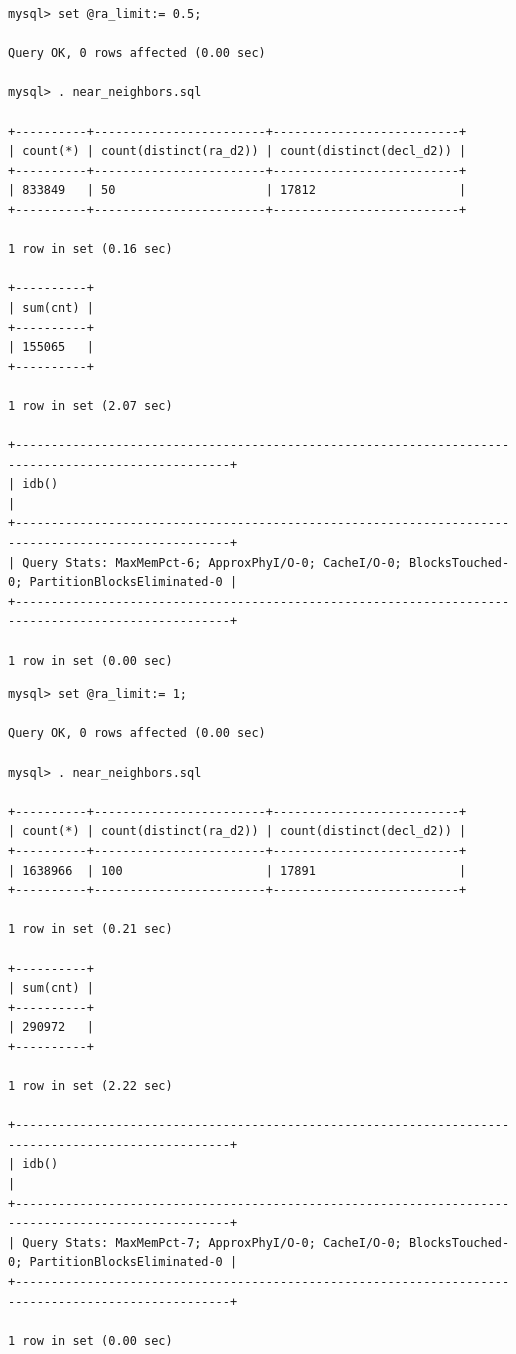 \documentclass[DM,lsstdraft,toc]{lsstdoc}
\begin{document}
\begin{verbatim}
mysql> set @ra_limit:= 0.5;

Query OK, 0 rows affected (0.00 sec)

mysql> . near_neighbors.sql

+----------+------------------------+--------------------------+
| count(*) | count(distinct(ra_d2)) | count(distinct(decl_d2)) |
+----------+------------------------+--------------------------+
| 833849   | 50                     | 17812                    |
+----------+------------------------+--------------------------+

1 row in set (0.16 sec)

+----------+
| sum(cnt) |
+----------+
| 155065   |
+----------+

1 row in set (2.07 sec)

+----------------------------------------------------------------------------------------------------+
| idb()                                                                                              |
+----------------------------------------------------------------------------------------------------+
| Query Stats: MaxMemPct-6; ApproxPhyI/O-0; CacheI/O-0; BlocksTouched-0; PartitionBlocksEliminated-0 |
+----------------------------------------------------------------------------------------------------+

1 row in set (0.00 sec)
\end{verbatim}

\begin{verbatim}
mysql> set @ra_limit:= 1;

Query OK, 0 rows affected (0.00 sec)

mysql> . near_neighbors.sql

+----------+------------------------+--------------------------+
| count(*) | count(distinct(ra_d2)) | count(distinct(decl_d2)) |
+----------+------------------------+--------------------------+
| 1638966  | 100                    | 17891                    |
+----------+------------------------+--------------------------+

1 row in set (0.21 sec)

+----------+
| sum(cnt) |
+----------+
| 290972   |
+----------+

1 row in set (2.22 sec)

+----------------------------------------------------------------------------------------------------+
| idb()                                                                                              |
+----------------------------------------------------------------------------------------------------+
| Query Stats: MaxMemPct-7; ApproxPhyI/O-0; CacheI/O-0; BlocksTouched-0; PartitionBlocksEliminated-0 |
+----------------------------------------------------------------------------------------------------+

1 row in set (0.00 sec)
\end{verbatim}
\end{document}
